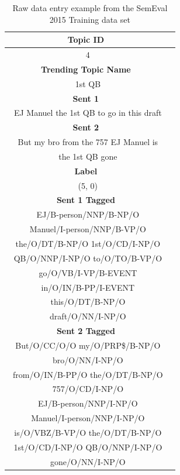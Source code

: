 \documentclass[11pt,letterpaper]{article}
\begin{document}
\begin{table}
\begin{center}
\begin{tabularx}{190pt}{|c|c|}
\hline
\bf Topic ID \\
\hline
\ 4 \\
\hline
\bf Trending Topic Name \\
\hline
\ 1st QB\\
\hline
\bf Sent 1 \\
\hline
\ EJ Manuel the 1st QB to go in this draft \\
\hline
\bf Sent 2 \\
\hline
\ But my bro from the 757 EJ Manuel is\\ 
\ the 1st QB gone \\
\hline
\bf Label \\
\hline
\ (5, 0) \\
\hline
\bf Sent 1 Tagged \\
\hline
\ EJ/B-person/NNP/B-NP/O \\
\ Manuel/I-person/NNP/B-VP/O \\
\ the/O/DT/B-NP/O 1st/O/CD/I-NP/O \\
\ QB/O/NNP/I-NP/O to/O/TO/B-VP/O \\
\ go/O/VB/I-VP/B-EVENT \\
\ in/O/IN/B-PP/I-EVENT \\ 
\ this/O/DT/B-NP/O \\ 
\ draft/O/NN/I-NP/O \\
\hline
\bf Sent 2 Tagged \\
\hline
\ But/O/CC/O/O my/O/PRP\$/B-NP/O \\
\ bro/O/NN/I-NP/O \\ 
\ from/O/IN/B-PP/O the/O/DT/B-NP/O \\
\ 757/O/CD/I-NP/O \\
\ EJ/B-person/NNP/I-NP/O \\
\ Manuel/I-person/NNP/I-NP/O \\
\ is/O/VBZ/B-VP/O the/O/DT/B-NP/O \\ 
\ 1st/O/CD/I-NP/O QB/O/NNP/I-NP/O \\
\ gone/O/NN/I-NP/O \\
\hline
\end{tabularx}
\end{center}
\caption{\label{provided-data} Raw data entry example from the SemEval 2015 Training data set }
\end{table}
\end{document}
